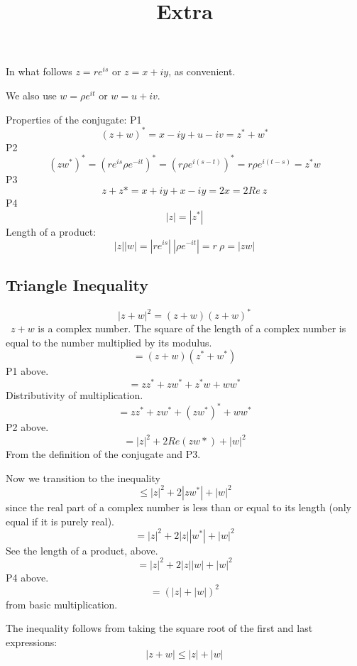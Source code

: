 \documentclass[11pt, oneside]{article}
\title{Extra}
\date{}
\begin{document}
\maketitle
\Large


In what follows $z = re^{is}$ or $z = x + iy$, as convenient.

We also use $w = \rho e^{it}$ or $w = u + iv$.

Properties of the conjugate:
P1
\[ (z + w)^* = x - iy + u - iv = z^* + w^* \]
P2
\[ (zw^*)^* = (re^{is}  \rho e^{-it})^* = (r \rho e^{i(s - t)})^* = r \rho e^{i(t - s)} = z^*w \]
P3
\[ z + z* = x + iy + x - iy = 2x = 2 Re \ z \]
P4
\[ |z| = |z^*| \]
Length of a product:
\[ |z| |w| = |re^{is}| \  |\rho e^{-it}| = r \ \rho= |zw| \]

\subsection*{Triangle Inequality}

\[ |z + w|^2 = (z + w)(z + w)^* \]\
$z + w$ is a complex number.  The square of the length of a complex number is equal to the number multiplied by its modulus.
\[ = (z + w)(z^* + w^*) \]
P1 above.
\[ = zz^* + zw^* + z^*w + ww^* \]
Distributivity of multiplication.
\[ = zz^* + zw^* + (zw^*)^* + ww^* \]
P2 above.
\[ = |z|^2 + 2 Re (zw*) + |w|^2 \]
From the definition of the conjugate and P3.

Now we transition to the inequality
\[ \le |z|^2 + 2 |zw^*| + |w|^2 \]
since the real part of a complex number is less than or equal to its length (only equal if it is purely real).
\[ = |z|^2 + 2 |z| |w^*| + |w|^2 \]
See the length of a product, above.
\[ = |z|^2 + 2 |z| |w| + |w|^2 \]
P4 above.
\[ = (|z| + |w|)^2 \]
from basic multiplication.

The inequality follows from taking the square root of the first and last expressions:
\[ |z + w| \le |z| + |w| \]
\end{document}
